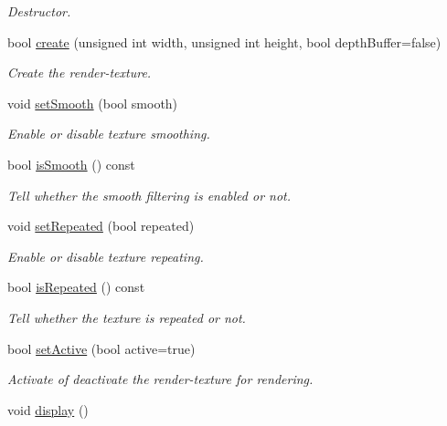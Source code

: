 \begin{DoxyCompactItemize}
\begin{DoxyCompactList}\small\item\em Destructor. \end{DoxyCompactList}\item 
bool \hyperlink{classsf_1_1RenderTexture_aefbb76eb3b87e368ab974b2660931ccb}{create} (unsigned int width, unsigned int height, bool depth\-Buffer=false)
\begin{DoxyCompactList}\small\item\em Create the render-\/texture. \end{DoxyCompactList}\item 
void \hyperlink{classsf_1_1RenderTexture_af08991e63c6020865dd07b20e27305b6}{set\-Smooth} (bool smooth)
\begin{DoxyCompactList}\small\item\em Enable or disable texture smoothing. \end{DoxyCompactList}\item 
bool \hyperlink{classsf_1_1RenderTexture_ae385f4f4dbd2af50fb11947bf0bcb83d}{is\-Smooth} () const 
\begin{DoxyCompactList}\small\item\em Tell whether the smooth filtering is enabled or not. \end{DoxyCompactList}\item 
void \hyperlink{classsf_1_1RenderTexture_af8f97b33512bf7d5b6be3da6f65f7365}{set\-Repeated} (bool repeated)
\begin{DoxyCompactList}\small\item\em Enable or disable texture repeating. \end{DoxyCompactList}\item 
bool \hyperlink{classsf_1_1RenderTexture_ae480a2ec7ee166afa50232e634d2668c}{is\-Repeated} () const 
\begin{DoxyCompactList}\small\item\em Tell whether the texture is repeated or not. \end{DoxyCompactList}\item 
bool \hyperlink{classsf_1_1RenderTexture_a5da95ecdbce615a80bb78399012508cf}{set\-Active} (bool active=true)
\begin{DoxyCompactList}\small\item\em Activate of deactivate the render-\/texture for rendering. \end{DoxyCompactList}\item 
void \hyperlink{classsf_1_1RenderTexture_af92886d5faef3916caff9fa9ab32c555}{display} ()

\end{DoxyCompactItemize}
